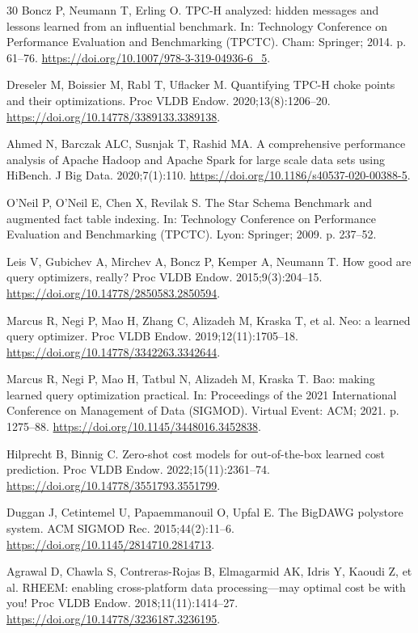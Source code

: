 \documentclass[10pt,a4paper]{article}
\begin{document}
{\begin{thebibliography}{30}
Boncz P, Neumann T, Erling O. TPC-H analyzed: hidden messages and lessons learned from an influential benchmark. In: Technology Conference on Performance Evaluation and Benchmarking (TPCTC). Cham: Springer; 2014. p. 61--76. \url{https://doi.org/10.1007/978-3-319-04936-6_5}.

Dreseler M, Boissier M, Rabl T, Uflacker M. Quantifying TPC-H choke points and their optimizations. Proc VLDB Endow. 2020;13(8):1206--20. \url{https://doi.org/10.14778/3389133.3389138}.

Ahmed N, Barczak ALC, Susnjak T, Rashid MA. A comprehensive performance analysis of Apache Hadoop and Apache Spark for large scale data sets using HiBench. J Big Data. 2020;7(1):110. \url{https://doi.org/10.1186/s40537-020-00388-5}.

O'Neil P, O'Neil E, Chen X, Revilak S. The Star Schema Benchmark and augmented fact table indexing. In: Technology Conference on Performance Evaluation and Benchmarking (TPCTC). Lyon: Springer; 2009. p. 237--52.

Leis V, Gubichev A, Mirchev A, Boncz P, Kemper A, Neumann T. How good are query optimizers, really? Proc VLDB Endow. 2015;9(3):204--15. \url{https://doi.org/10.14778/2850583.2850594}.

Marcus R, Negi P, Mao H, Zhang C, Alizadeh M, Kraska T, et al. Neo: a learned query optimizer. Proc VLDB Endow. 2019;12(11):1705--18. \url{https://doi.org/10.14778/3342263.3342644}.

Marcus R, Negi P, Mao H, Tatbul N, Alizadeh M, Kraska T. Bao: making learned query optimization practical. In: Proceedings of the 2021 International Conference on Management of Data (SIGMOD). Virtual Event: ACM; 2021. p. 1275--88. \url{https://doi.org/10.1145/3448016.3452838}.

Hilprecht B, Binnig C. Zero-shot cost models for out-of-the-box learned cost prediction. Proc VLDB Endow. 2022;15(11):2361--74. \url{https://doi.org/10.14778/3551793.3551799}.

Duggan J, Cetintemel U, Papaemmanouil O, Upfal E. The BigDAWG polystore system. ACM SIGMOD Rec. 2015;44(2):11--6. \url{https://doi.org/10.1145/2814710.2814713}.

Agrawal D, Chawla S, Contreras-Rojas B, Elmagarmid AK, Idris Y, Kaoudi Z, et al. RHEEM: enabling cross-platform data processing---may optimal cost be with you! Proc VLDB Endow. 2018;11(11):1414--27. \url{https://doi.org/10.14778/3236187.3236195}.


\end{thebibliography}}
\end{document}
